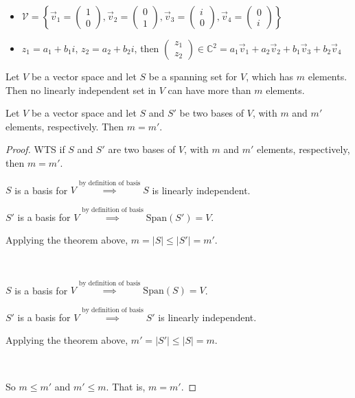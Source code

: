 \documentclass[11pt,fleqn]{book} %
\begin{document}
\begin{example}
\begin{itemize}
\begin{itemize}
            \item $\mathcal{V} = \left\{ \vec{v}_1 = \begin{pmatrix} 1\\0 \end{pmatrix}, \vec{v}_2 = \begin{pmatrix} 0\\1 \end{pmatrix}, \vec{v}_3 = \begin{pmatrix} i\\0 \end{pmatrix}, \vec{v}_4 = \begin{pmatrix} 0\\i \end{pmatrix} \right\}$
            \item $z_1 = a_1 + b_1i$, $z_2 = a_2+b_2i$, then $\begin{pmatrix} z_1\\z_2 \end{pmatrix} \in \mathbb{C}^2 = a_1\vec{v}_1 + a_2\vec{v}_2 + b_1\vec{v}_3 + b_2\vec{v}_4$
        \end{itemize}
    \end{itemize}
\end{example}

\setcounter{dummy}{9}
\begin{theorem}
    Let $V$ be a  vector space and let $S$ be a spanning set for $V$, which has $m$ elements. Then no linearly independent set in $V$ can have more than $m$ elements. 
\end{theorem}

\begin{corollary}
    Let $V$ be a vector space and let $S$ and $S'$ be two bases of $V$, with $m$ and $m'$ elements, respectively. Then $m = m'$.
\end{corollary}

\begin{proof}
    WTS if $S$ and $S'$ are two bases of $V$, with $m$ and $m'$ elements, respectively, then $m = m'$.

    $S$ is a basis for $V \overset{\text{by definition of basis}}{\implies} S$ is linearly independent. 

    $S'$ is a basis for $V \overset{\text{by definition of basis}}{\implies} \mathrm{Span}(S')=V$. 

    Applying the theorem above, $m = |S| \le |S'| = m'$. 
    
    {~~~}

    $S$ is a basis for $V \overset{\text{by definition of basis}}{\implies} \mathrm{Span}(S)=V$. 
    
    $S'$ is a basis for $V \overset{\text{by definition of basis}}{\implies} S'$ is linearly independent. 

    Applying the theorem above, $m' = |S'| \le |S| = m$. 
    
    {~~~}
    
    So $m \le m'$ and $m' \le m$. That is, $m = m'$. 
\end{proof}
\end{document}
